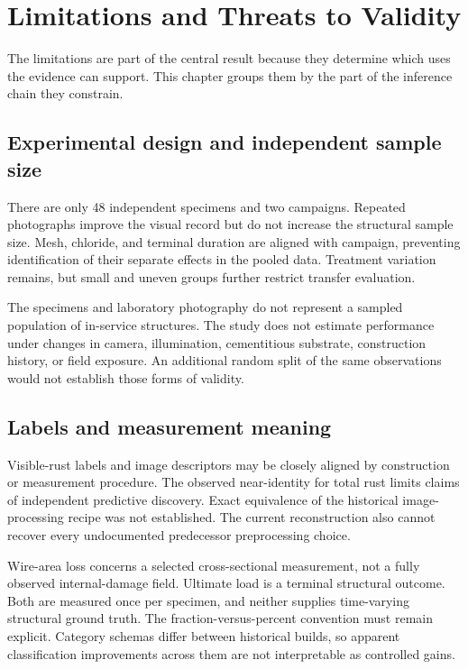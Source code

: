 \chapter{Limitations and Threats to Validity}\label{ch:limitations}
The limitations are part of the central result because they determine which uses the evidence can support. This chapter groups them by the part of the inference chain they constrain.

\section{Experimental design and independent sample size}
There are only 48 independent specimens and two campaigns. Repeated photographs improve the visual record but do not increase the structural sample size. Mesh, chloride, and terminal duration are aligned with campaign, preventing identification of their separate effects in the pooled data. Treatment variation remains, but small and uneven groups further restrict transfer evaluation.

The specimens and laboratory photography do not represent a sampled population of in-service structures. The study does not estimate performance under changes in camera, illumination, cementitious substrate, construction history, or field exposure. An additional random split of the same observations would not establish those forms of validity.

\section{Labels and measurement meaning}
Visible-rust labels and image descriptors may be closely aligned by construction or measurement procedure. The observed near-identity for total rust limits claims of independent predictive discovery. Exact equivalence of the historical image-processing recipe was not established. The current reconstruction also cannot recover every undocumented predecessor preprocessing choice.

Wire-area loss concerns a selected cross-sectional measurement, not a fully observed internal-damage field. Ultimate load is a terminal structural outcome. Both are measured once per specimen, and neither supplies time-varying structural ground truth. The fraction-versus-percent convention must remain explicit. Category schemas differ between historical builds, so apparent classification improvements across them are not interpretable as controlled gains.

